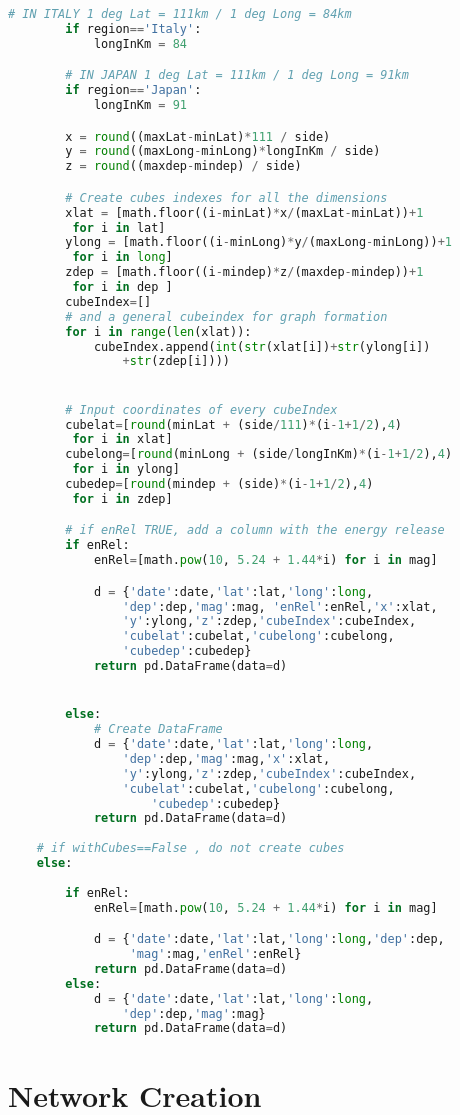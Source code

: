 \documentclass[12pt, twoside]{report}
\begin{document}
\begin{appendices}
\begin{lstlisting}[language=python, frame=single, tabsize=1]
		# IN ITALY 1 deg Lat = 111km / 1 deg Long = 84km
		if region=='Italy':
			longInKm = 84

		# IN JAPAN 1 deg Lat = 111km / 1 deg Long = 91km
		if region=='Japan':
			longInKm = 91

		x = round((maxLat-minLat)*111 / side)
		y = round((maxLong-minLong)*longInKm / side)
		z = round((maxdep-mindep) / side)

		# Create cubes indexes for all the dimensions 
		xlat = [math.floor((i-minLat)*x/(maxLat-minLat))+1
		 for i in lat]
		ylong = [math.floor((i-minLong)*y/(maxLong-minLong))+1
		 for i in long]
		zdep = [math.floor((i-mindep)*z/(maxdep-mindep))+1
		 for i in dep ]
		cubeIndex=[]
		# and a general cubeindex for graph formation
		for i in range(len(xlat)):
			cubeIndex.append(int(str(xlat[i])+str(ylong[i])
				+str(zdep[i])))


		# Input coordinates of every cubeIndex
		cubelat=[round(minLat + (side/111)*(i-1+1/2),4)
		 for i in xlat]
		cubelong=[round(minLong + (side/longInKm)*(i-1+1/2),4)
		 for i in ylong]
		cubedep=[round(mindep + (side)*(i-1+1/2),4)
		 for i in zdep]

		# if enRel TRUE, add a column with the energy release 
		if enRel:
			enRel=[math.pow(10, 5.24 + 1.44*i) for i in mag]

			d = {'date':date,'lat':lat,'long':long,
				'dep':dep,'mag':mag, 'enRel':enRel,'x':xlat,
				'y':ylong,'z':zdep,'cubeIndex':cubeIndex,
				'cubelat':cubelat,'cubelong':cubelong,
				'cubedep':cubedep}
			return pd.DataFrame(data=d)


		else:
			# Create DataFrame
			d = {'date':date,'lat':lat,'long':long,
				'dep':dep,'mag':mag,'x':xlat,
				'y':ylong,'z':zdep,'cubeIndex':cubeIndex,
				'cubelat':cubelat,'cubelong':cubelong,
					'cubedep':cubedep}
			return pd.DataFrame(data=d)
	
	# if withCubes==False , do not create cubes 
	else:
	
		if enRel:
			enRel=[math.pow(10, 5.24 + 1.44*i) for i in mag]

			d = {'date':date,'lat':lat,'long':long,'dep':dep,
			     'mag':mag,'enRel':enRel}
			return pd.DataFrame(data=d)
		else:
			d = {'date':date,'lat':lat,'long':long,
				'dep':dep,'mag':mag}
			return pd.DataFrame(data=d)

\end{lstlisting}


\chapter{Network Creation}


\end{appendices}
\end{document}
